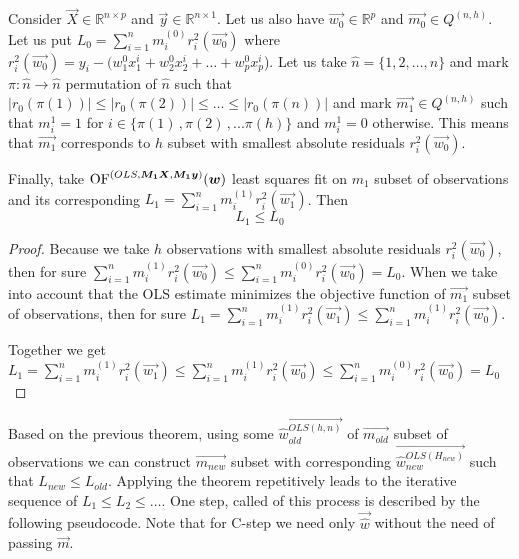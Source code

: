 
\begin{theorem}
Consider 
$\vec{X} \in \mathbb{R}^{n \times p}$ and 
$\vec{y} \in \mathbb{R}^{n \times 1}$.  
Let us also have $\vec{w_0}\in\mathbb{R}^p$ and $\vec{m_0} \in Q^{(n,h)}$. 
Let us put $L_0 = \sum\limits_{i=1}^n m^{(0)}_i r_{i}^2(\vec{w_0})$ where $r_{i}^2(\vec{w_0}) = y_i - (w_1^0x^i_1 + w_2^0x^i_2 +\ldots+ w_p^0x^i_p$).
Let us take $\hat{n} = \{{1,2,\ldots,n\}}$ and mark
$\pi: \hat{n} \rightarrow \hat{n}$ permutation of $\hat{n}$ such that $|r_0({\pi(1)})| \leq |r_0({\pi(2)})| \leq \ldots \leq |r_0({\pi(n)})|$
and mark   $\vec{m_1} \in Q^{(n,h)}$  such that $m^1_i = 1$ for $i \in \{{\pi(1)\,, \pi(2)\,,... \pi(h)\}}$ and  $m^1_i = 0$  otherwise. 
This means that  $\vec{m_1}$ corresponds to $h$ subset with smallest absolute residuals $r_{i}^2(\vec{w_0})$.

Finally, take
$\operatorname{OF}^{(OLS,\boldsymbol{M_1}\boldsymbol{X},  \boldsymbol{M_1}\boldsymbol{y} )} (\boldsymbol{w})$ least squares fit on $m_1$ subset of observations and its corresponding 
$L_1 = \sum\limits_{i=1}^n m^{(1)}_i r_{i}^2(\vec{w_1})$. Then
\begin{equation} 
    L_1  \leq L_0
\end{equation}
\end{theorem}

\begin{proof}
    Because we take $h$ observations with smallest absolute residuals $r_{i}^2(\vec{w_0})$, then for sure
$\sum\limits_{i=1}^n m^{(1)}_i r_{i}^2(\vec{w_0})
\leq
\sum\limits_{i=1}^n m^{(0)}_i r_{i}^2(\vec{w_0}) =  L_0
$.
When we take into account that the OLS estimate minimizes the objective function of $\vec{m_1}$ subset of observations, then for sure  
$L_1 =  \sum\limits_{i=1}^n m^{(1)}_i r_{i}^2(\vec{w_1})
 \leq 
\sum\limits_{i=1}^n m^{(1)}_i r_{i}^2(\vec{w_0})$.

Together we get 
$
L_1 = \sum\limits_{i=1}^n m^{(1)}_i r_{i}^2(\vec{w_1})
\leq
\sum\limits_{i=1}^n m^{(1)}_i r_{i}^2(\vec{w_0})
\leq
\sum\limits_{i=1}^n m^{(0)}_i r_{i}^2(\vec{w_0}) =  L_0
$
\end{proof}


\begin{corollary} 
    Based on the previous theorem, using some $\vec{\hat{w}_{old}^{OLS(h, n)}}$  of $\vec{m_{old}}$ subset of observations we can construct $\vec{m_{new}}$ subset with corresponding $\vec{\hat{w}_{new}^{OLS(H_{new})}}$ such that $L_{new} \leq L_{old}$. 
    Applying the theorem repetitively leads to the iterative sequence of
    $L_{1} \leq L_{2} \leq \ldots$. One step, called  of this process is described by the following pseudocode. Note that for C-step we  need only $\vec{\hat{w}}$ 
     without the need of passing  $\vec{m}$.
\end{corollary}

